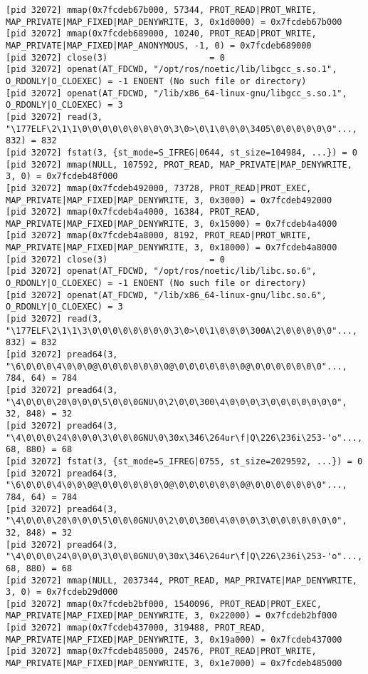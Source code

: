 \documentclass[a4paper, 14pt]{article}
\begin{document}
\begin{lstlisting}
[pid 32072] mmap(0x7fcdeb67b000, 57344, PROT_READ|PROT_WRITE, MAP_PRIVATE|MAP_FIXED|MAP_DENYWRITE, 3, 0x1d0000) = 0x7fcdeb67b000
[pid 32072] mmap(0x7fcdeb689000, 10240, PROT_READ|PROT_WRITE, MAP_PRIVATE|MAP_FIXED|MAP_ANONYMOUS, -1, 0) = 0x7fcdeb689000
[pid 32072] close(3)                    = 0
[pid 32072] openat(AT_FDCWD, "/opt/ros/noetic/lib/libgcc_s.so.1", O_RDONLY|O_CLOEXEC) = -1 ENOENT (No such file or directory)
[pid 32072] openat(AT_FDCWD, "/lib/x86_64-linux-gnu/libgcc_s.so.1", O_RDONLY|O_CLOEXEC) = 3
[pid 32072] read(3, "\177ELF\2\1\1\0\0\0\0\0\0\0\0\0\3\0>\0\1\0\0\0\3405\0\0\0\0\0\0"..., 832) = 832
[pid 32072] fstat(3, {st_mode=S_IFREG|0644, st_size=104984, ...}) = 0
[pid 32072] mmap(NULL, 107592, PROT_READ, MAP_PRIVATE|MAP_DENYWRITE, 3, 0) = 0x7fcdeb48f000
[pid 32072] mmap(0x7fcdeb492000, 73728, PROT_READ|PROT_EXEC, MAP_PRIVATE|MAP_FIXED|MAP_DENYWRITE, 3, 0x3000) = 0x7fcdeb492000
[pid 32072] mmap(0x7fcdeb4a4000, 16384, PROT_READ, MAP_PRIVATE|MAP_FIXED|MAP_DENYWRITE, 3, 0x15000) = 0x7fcdeb4a4000
[pid 32072] mmap(0x7fcdeb4a8000, 8192, PROT_READ|PROT_WRITE, MAP_PRIVATE|MAP_FIXED|MAP_DENYWRITE, 3, 0x18000) = 0x7fcdeb4a8000
[pid 32072] close(3)                    = 0
[pid 32072] openat(AT_FDCWD, "/opt/ros/noetic/lib/libc.so.6", O_RDONLY|O_CLOEXEC) = -1 ENOENT (No such file or directory)
[pid 32072] openat(AT_FDCWD, "/lib/x86_64-linux-gnu/libc.so.6", O_RDONLY|O_CLOEXEC) = 3
[pid 32072] read(3, "\177ELF\2\1\1\3\0\0\0\0\0\0\0\0\3\0>\0\1\0\0\0\300A\2\0\0\0\0\0"..., 832) = 832
[pid 32072] pread64(3, "\6\0\0\0\4\0\0\0@\0\0\0\0\0\0\0@\0\0\0\0\0\0\0@\0\0\0\0\0\0\0"..., 784, 64) = 784
[pid 32072] pread64(3, "\4\0\0\0\20\0\0\0\5\0\0\0GNU\0\2\0\0\300\4\0\0\0\3\0\0\0\0\0\0\0", 32, 848) = 32
[pid 32072] pread64(3, "\4\0\0\0\24\0\0\0\3\0\0\0GNU\0\30x\346\264ur\f|Q\226\236i\253-'o"..., 68, 880) = 68
[pid 32072] fstat(3, {st_mode=S_IFREG|0755, st_size=2029592, ...}) = 0
[pid 32072] pread64(3, "\6\0\0\0\4\0\0\0@\0\0\0\0\0\0\0@\0\0\0\0\0\0\0@\0\0\0\0\0\0\0"..., 784, 64) = 784
[pid 32072] pread64(3, "\4\0\0\0\20\0\0\0\5\0\0\0GNU\0\2\0\0\300\4\0\0\0\3\0\0\0\0\0\0\0", 32, 848) = 32
[pid 32072] pread64(3, "\4\0\0\0\24\0\0\0\3\0\0\0GNU\0\30x\346\264ur\f|Q\226\236i\253-'o"..., 68, 880) = 68
[pid 32072] mmap(NULL, 2037344, PROT_READ, MAP_PRIVATE|MAP_DENYWRITE, 3, 0) = 0x7fcdeb29d000
[pid 32072] mmap(0x7fcdeb2bf000, 1540096, PROT_READ|PROT_EXEC, MAP_PRIVATE|MAP_FIXED|MAP_DENYWRITE, 3, 0x22000) = 0x7fcdeb2bf000
[pid 32072] mmap(0x7fcdeb437000, 319488, PROT_READ, MAP_PRIVATE|MAP_FIXED|MAP_DENYWRITE, 3, 0x19a000) = 0x7fcdeb437000
[pid 32072] mmap(0x7fcdeb485000, 24576, PROT_READ|PROT_WRITE, MAP_PRIVATE|MAP_FIXED|MAP_DENYWRITE, 3, 0x1e7000) = 0x7fcdeb485000

\end{lstlisting}
\end{document}
